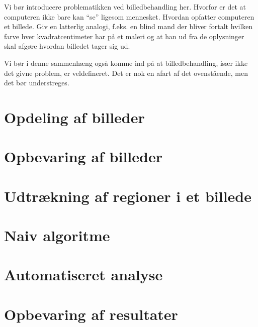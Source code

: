 {
{\sffamily Vi bør introducere problematikken ved billedbehandling her.
Hvorfor er det at computeren ikke bare kan ``se'' ligesom mennesket.
Hvordan opfatter computeren et billede. Giv en latterlig analogi, f.eks.
en blind mand der bliver fortalt hvilken farve hver kvadratcentimeter
har på et maleri og at han ud fra de oplysninger skal afgøre hvordan
billedet tager sig ud.

Vi bør i denne sammenhæng også komme ind på at billedbehandling, især
ikke det givne problem, er veldefineret. Det er nok en afart af det
ovenstående, men det bør understreges.
}

\section{Opdeling af billeder}


\section{Opbevaring af billeder\label{section_opbv_billeder}}


\section{Udtrækning af regioner i et billede}


\section{Naiv algoritme\label{naiv_algoritme}}


\section{Automatiseret analyse}


\section{Opbevaring af resultater\label{section_results}}


}

